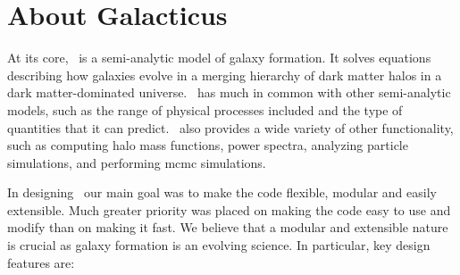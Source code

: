 \chapter{About Galacticus}

At its core, \glc\ is a semi-analytic model of galaxy formation. It solves equations describing how galaxies evolve in a merging hierarchy of dark matter halos in a dark matter-dominated universe. \glc\ has much in common with other semi-analytic models, such as the range of physical processes included and the type of quantities that it can predict. \glc\ also provides a wide variety of other functionality, such as computing halo mass functions, power spectra, analyzing particle simulations, and performing \gls{mcmc} simulations.

In designing \glc\ our main goal was to make the code flexible, modular and easily extensible. Much greater priority was placed on making the code easy to use and modify than on making it fast. We believe that a modular and extensible nature is crucial as galaxy formation is an evolving science. In particular, key design features are:
